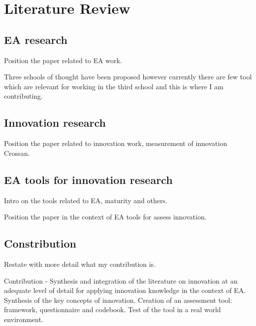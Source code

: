 
\chapter{Literature Review} %

\label{Chapter2} %



\section{EA research}
Position the paper related to EA work.

Three schools of thought have been proposed however currently there are few tool which are relevant for working in the third school and this is where I am contributing.

\section{Innovation research}
Position the paper related to innovation work, measurement of innovation Crossan.

\section{EA tools for innovation research}
Intro on the tools related to EA, maturity and others.

Position the paper in the context of EA tools for assess innovation.


\section{Constribution}
Restate with more detail what my contribution is.

Contribution - Synthesis and integration of the literature on innovation at an adequate level of detail for applying innovation knowledge in the context of EA. 
Synthesis of the key concepts of innovation. 
Creation of an assessment tool: framework, questionnaire and codebook. 
Test of the tool in a real world environment.
